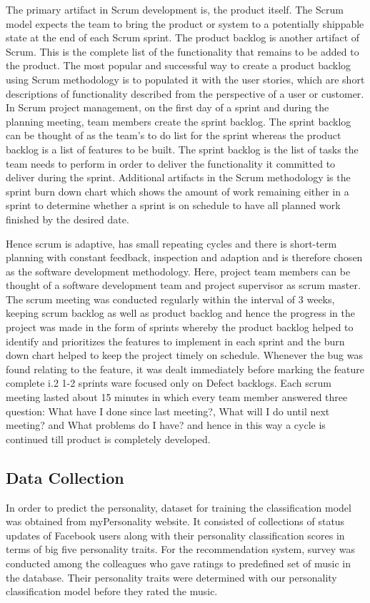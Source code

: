The primary artifact in Scrum development is, the product itself. The Scrum model expects the team to bring the product or system to a potentially shippable state at the end of each Scrum sprint. The product backlog is another artifact of Scrum. This is the complete list of the functionality that remains to be added to the product. The most popular and successful way to create a product backlog using Scrum methodology is to populated it with the user stories, which are short descriptions of functionality described from the perspective of a user or customer. In Scrum project management, on the first day of a sprint and during the planning meeting, team members create the sprint backlog. The sprint backlog can be thought of as the team's to do list for the sprint whereas the product backlog is a list of features to be built. The sprint backlog is the list of tasks the team needs to perform in order to deliver the functionality it committed to deliver during the sprint. Additional artifacts in the Scrum methodology is the sprint burn down chart which shows the amount of work remaining either in a sprint to determine whether a sprint is on schedule to have all planned work finished by the desired date.

Hence scrum is adaptive, has small repeating cycles and there is short-term planning with constant feedback, inspection and adaption and is therefore chosen as the software development methodology. Here, project team members can be thought of a software development team and project supervisor as scrum master. The scrum meeting was conducted regularly within the interval of 3 weeks, keeping scrum backlog as well as product backlog and hence the progress in the project was made in the form of sprints whereby the product backlog helped to identify and prioritizes the features to implement in each sprint and the burn down chart helped to keep the project timely on schedule. Whenever the bug was found relating to the feature, it was dealt immediately before marking the feature complete i.2 1-2 sprints ware focused only on Defect backlogs. Each scrum meeting lasted about 15 minutes in which every team member answered three question: What have I done since last meeting?, What will I do until next meeting? and What problems do I have? and hence in this way a cycle is continued till product is completely developed.


\subsection{Data Collection}
In order to predict the personality, dataset for training the classification model was obtained from myPersonality website\cite{dataset}. It consisted of collections of status updates of Facebook users along with their personality classification scores in terms of big five personality traits. For the recommendation system, survey was conducted among the colleagues who gave ratings to predefined set of music in the database. Their personality traits were determined with our personality classification model before they rated the music.
